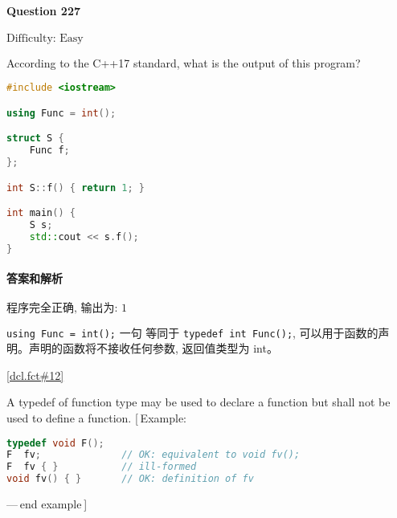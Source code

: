 \documentclass{article}
\begin{document}
	\paragraph*{Question 227} $\boxed{\text{Difficulty: Easy}} $			
	
	According to the C++17 standard, what is the output of this program?
	
	\begin{lstlisting}[language=C++]  		
#include <iostream>

using Func = int();

struct S {
	Func f;
};

int S::f() { return 1; }

int main() {
	S s;
	std::cout << s.f();
}
	\end{lstlisting}
	
	\paragraph*{答案和解析} $\boxed{\text{程序完全正确, 输出为: 1}} $
	
    \verb|using Func = int();| 一句 等同于 \verb|typedef int Func();|, 可以用于函数的声明。声明的函数将不接收任何参数, 返回值类型为 int。
	
	\href{https://timsong-cpp.github.io/cppwp/n4659/dcl.fct#12}{[dcl.fct\#12]}
	
	\begin{lightgrayleftbar}
	A typedef of function type may be used to declare a function but shall not be used to define a function. [ Example:
	
	\begin{lstlisting}[language=C++]
typedef void F();
F  fv;              // OK: equivalent to void fv();
F  fv { }           // ill-formed
void fv() { }       // OK: definition of fv
	\end{lstlisting}

	
	— end example ] 
	\end{lightgrayleftbar} 
	
\end{document}

